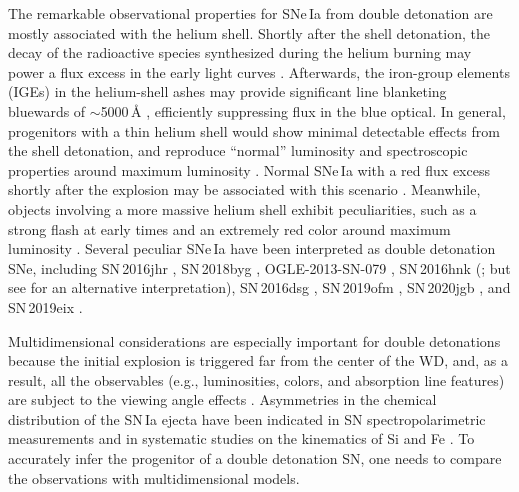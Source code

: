 \documentclass[twocolumn]{aastex631}
\newcommand{\chang}[1]{\textcolor{blue}{[Chang: #1]}}
\begin{document}
\begin{CJK*}{UTF8}{gbsn}
The remarkable observational properties for SNe\,Ia from double detonation are mostly associated with the helium shell. Shortly after the shell detonation, the decay of the radioactive species synthesized during the helium burning may power a flux excess in the early light curves \citep{Woosley_1994,Fink_DD_2010,Kromer_DD_2010}. Afterwards, the iron-group elements (IGEs) in the helium-shell ashes may provide significant line blanketing bluewards of $\sim$5000\,\r{A} \citep{Kromer_DD_2010}, efficiently suppressing flux in the blue optical. In general, progenitors with a thin helium shell would show minimal detectable effects from the shell detonation, and reproduce ``normal'' luminosity and spectroscopic properties around maximum luminosity \citep[e.g.,][]{polin_observational_2019, Townsley_2019,Magee_2021,Shen_2D_2021}. Normal SNe\,Ia with a red flux excess shortly after the explosion may be associated with this scenario \citep[e.g., SN\,2018aoz;][]{Ni_2022}. Meanwhile, objects involving a more massive helium shell exhibit peculiarities, such as a strong flash at early times and an extremely red color around maximum luminosity \citep{polin_observational_2019}. Several peculiar SNe\,Ia have been interpreted as double detonation SNe, including SN\,2016jhr \citep{jiang_16jhr_2017}, SN\,2018byg \citep{de_18byg_2019}, OGLE-2013-SN-079 \citep[][interpretted as either a pure helium-shell detonation or a double detonation]{Inserra_OGLE13_079_2015}, %
SN\,2016hnk (\citealp{jacobson-galan_16hnk_2020}; but see \citealp{galbany_16hnk_2019} for an alternative interpretation), SN\,2016dsg \citep{Dong_16dsg_2022}, SN\,2019ofm \citep{de_Ca_rich_2020}, SN\,2020jgb \citep{Liu_20jgb_2023}, and SN\,2019eix \citep{Gonzalez_19eix_2023}. %

Multidimensional considerations are especially important for double detonations because the initial explosion is triggered far from the center of the WD, and, as a result, all the observables (e.g., luminosities, colors, and absorption line features) are subject to the viewing angle effects \citep{Fink_DD_2010,Shen_2D_2021}. Asymmetries in the chemical distribution of the SN\,Ia ejecta have been indicated in SN spectropolarimetric measurements \citep[e.g.,][see \citealp{Wang_2008} for a review]{Wang_2003,Kasen_2003, Patat_2012} and in systematic studies on the kinematics of Si and Fe \citep{Maeda_2010,Maguire_2018,Li_2021}. To accurately infer the progenitor of a double detonation SN, one needs to compare the observations with multidimensional models.


\end{CJK*}
\end{document}
